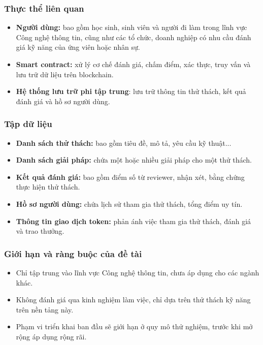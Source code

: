 \documentclass{article}[14pt]
\begin{document}
{    \subsubsection{Thực thể liên quan}
    \begin{itemize}
        \large
        \item \textbf{Người dùng:} bao gồm học sinh, sinh viên và người đi làm trong lĩnh vực Công nghệ thông tin, cũng như các tổ chức, doanh nghiệp có nhu cầu đánh giá kỹ năng của ứng viên hoặc nhân sự.
        \item \textbf{Smart contract:} xử lý cơ chế đánh giá, chấm điểm, xác thực, truy vấn và lưu trữ dữ liệu trên blockchain.
        \item \textbf{Hệ thống lưu trữ phi tập trung}: lưu trữ thông tin thử thách, kết quả đánh giá và hồ sơ người dùng.
    \end{itemize}

    \subsubsection{Tập dữ liệu}
    \begin{itemize}
        \large
        \item \textbf{Danh sách thử thách:} bao gồm tiêu đề, mô tả, yêu cầu kỹ thuật...
        \item \textbf{Danh sách giải pháp:} chứa một hoặc nhiều giải pháp cho một thử thách.
        \item \textbf{Kết quả đánh giá:} bao gồm điểm số từ reviewer, nhận xét, bằng chứng thực hiện thử thách.
        \item \textbf{Hồ sơ người dùng:} chứa lịch sử tham gia thử thách, tổng điểm uy tín.
        \item \textbf{Thông tin giao dịch token:} phản ánh việc tham gia thử thách, đánh giá và trao thưởng.
    \end{itemize}

    \subsubsection{Giới hạn và ràng buộc của đề tài}
    \begin{itemize}
        \large
        \item Chỉ tập trung vào lĩnh vực Công nghệ thông tin, chưa áp dụng cho các ngành khác.
        \item Không đánh giá qua kinh nghiệm làm việc, chỉ dựa trên thử thách kỹ năng trên nền tảng này.
        \item Phạm vi triển khai ban đầu sẽ giới hạn ở quy mô thử nghiệm, trước khi mở rộng áp dụng rộng rãi.
    \end{itemize}

}
\end{document}

